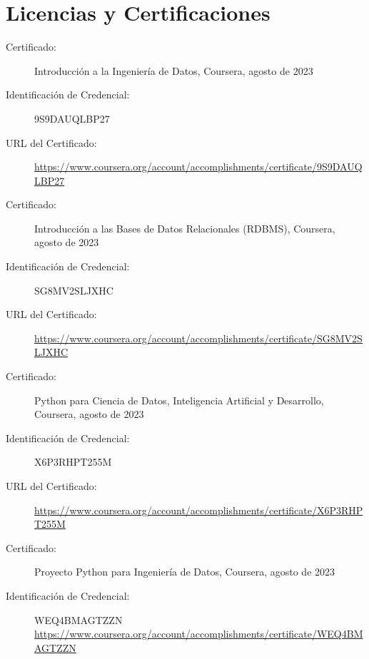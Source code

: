 \documentclass[a4paper,10pt]{article}
\begin{document}
\section*{Licencias y Certificaciones}
\begin{description}
    \item[Certificado:] Introducción a la Ingeniería de Datos, Coursera, agosto de 2023
    \item[Identificación de Credencial:] 9S9DAUQLBP27
    \item[URL del Certificado:] \url{https://www.coursera.org/account/accomplishments/certificate/9S9DAUQLBP27}
\end{description}

\vspace{1pt} %

\begin{description}
    \item[Certificado:] Introducción a las Bases de Datos Relacionales (RDBMS), Coursera, agosto de 2023
    \item[Identificación de Credencial:] SG8MV2SLJXHC
    \item[URL del Certificado:] \url{https://www.coursera.org/account/accomplishments/certificate/SG8MV2SLJXHC}
\end{description}

\vspace{1pt} %

\begin{description}
    \item[Certificado:] Python para Ciencia de Datos, Inteligencia Artificial y Desarrollo, Coursera, agosto de 2023
    \item[Identificación de Credencial:] X6P3RHPT255M
    \item[URL del Certificado:] \url{https://www.coursera.org/account/accomplishments/certificate/X6P3RHPT255M}
\end{description}

\vspace{1pt} %

\begin{description}
    \item[Certificado:] Proyecto Python para Ingeniería de Datos, Coursera, agosto de 2023
    \item[Identificación de Credencial:] WEQ4BMAGTZZN
    \url{https://www.coursera.org/account/accomplishments/certificate/WEQ4BMAGTZZN}
\end{description}
\end{document}
